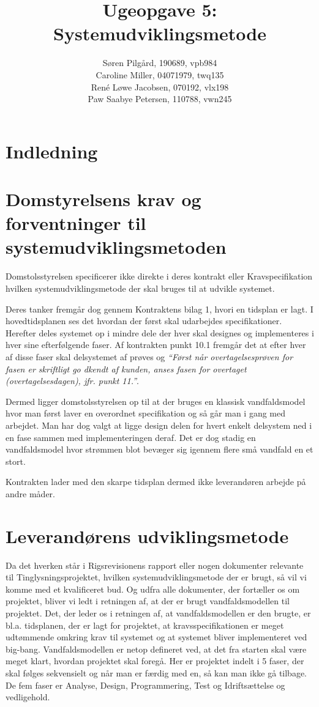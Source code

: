 \documentclass[10pt,a4paper,danish]{article}
\title{Ugeopgave 5: Systemudviklingsmetode}
\author{Søren Pilgård, 190689, vpb984\\
Caroline Miller, 04071979, twq135\\
René Løwe Jacobsen, 070192, vlx198\\
Paw Saabye Petersen, 110788, vwn245}
\begin{document}
\maketitle
\newpage


\section{Indledning}



\section{Domstyrelsens krav og forventninger til systemudviklingsmetoden}
Domstolsstyrelsen specificerer ikke direkte i deres kontrakt\cite{Kontrakt}
eller Kravspecifikation\cite{Krav} hvilken systemudviklingsmetode der skal
bruges til at udvikle systemet.

Deres tanker fremgår dog gennem Kontraktens bilag 1\cite{Tid}, hvori en tidsplan
er lagt.
I hovedtidsplanen ses det hvordan der først skal udarbejdes specifikationer.
Herefter deles systemet op i mindre dele der hver skal designes og implementeres
i hver sine efterfølgende faser. Af kontrakten punkt 10.1
fremgår det at efter hver af disse faser skal delsystemet af prøves og \textit{``Først når overtagelsesprøven for fasen er skriftligt go dkendt af kunden, anses
  fasen for overtaget (overtagelsesdagen), jfr. punkt 11.''}\cite[s.~16]{Kontrakt}.

Dermed ligger domstolsstyrelsen op til at der bruges en klassisk vandfaldsmodel
hvor man først laver en overordnet specifikation og så går man i gang med
arbejdet. Man har dog valgt at ligge design delen for hvert enkelt delsystem ned
i en fase sammen med implementeringen deraf. Det er dog stadig en vandfaldsmodel
hvor strømmen blot bevæger sig igennem flere små vandfald en et stort.


Kontrakten lader med den skarpe tidsplan dermed ikke leverandøren arbejde på
andre måder.

\section{Leverandørens udviklingsmetode}
Da det hverken står i Rigsrevisionens rapport eller nogen dokumenter relevante til Tinglysningsprojektet, hvilken systemudviklingsmetode der er brugt, så vil vi komme med et kvalificeret bud.
Og udfra alle dokumenter, der fortæller os om projektet, bliver vi ledt i retningen af, at der er brugt vandfaldsmodellen til projektet.
Det, der leder os i retningen af, at vandfaldsmodellen er den brugte, er bl.a. tidsplanen, der er lagt for projektet, at kravsspecifikationen er meget udtømmende omkring krav til systemet og
at systemet bliver implementeret ved big-bang.
Vandfaldsmodellen er netop defineret ved, at det fra starten skal være meget klart, hvordan projektet skal foregå.
Her er projektet indelt i 5 faser, der skal følges sekvensielt og når man er færdig med en, så kan man ikke gå tilbage.
De fem faser er Analyse, Design, Programmering, Test og Idriftsættelse og vedligehold.
\end{document}
